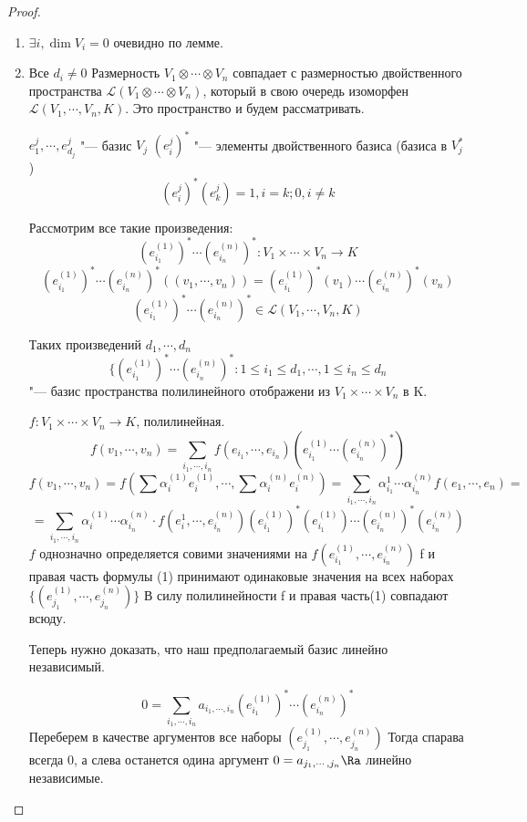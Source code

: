 \begin{proof}
    \begin{enumerate}
    \item $\exists i, \dim V_i = 0$ очевидно по лемме.
    \item Все $d_i \ne 0$
    Размерность $V_1 \otimes \cdots \otimes V_n$ совпадает
    с размерностью двойственного пространства $\mathcal{L}(V_1 \otimes \cdots \otimes V_n)$, который
    в свою очередь изоморфен $\mathcal{L}(V_1, \cdots, V_n, K)$. Это пространство и будем рассматривать.
  
    $e_1^{j}, \cdots, e_{d_j}^j$  "--- базис $V_j$
    $(e_i^j)^*$ "--- элементы двойственного базиса (базиса в $V_j^*$)
    $$(e_i^j)^*(e_{k}^j) =  1, i = k; 0, i \ne k$$
   
    Рассмотрим все такие произведения:
    $$(e^{(1)}_{i_1})^* \cdots (e_{i_n}^{(n)})^* \colon V_1 \times \cdots \times V_n \to K$$
    $$(e_{i_1}^{(1)})^* \cdots (e^{(n)}_{i_n})^*((v_1, \cdots, v_n)) = (e_{i_1}^{(1)})^*(v_1) \cdots (e_{i_n}^{(n)})^*(v_n)$$
    $$(e_{i_1}^{(1)})^* \cdots (e_{i_n}^{(n)})^* \in \mathcal{L}(V_1, \cdots, V_n, K)$$

    Таких произведений $d_1, \cdots, d_n$ 
    $$\{ (e_{i_1}^{(1)})^* \cdots (e_{i_n}^{(n)})^* \colon 1 \le i_1 \le d_1, \cdots, 1 \le i_n \le d_n$$ "--- базис
    пространства полилинейного отображени из $V_1 \times \cdots \times V_n$ в K.

    $f \colon V_1 \times \cdots \times V_n \to K$, полилинейная. 
    $$f(v_1, \cdots, v_n) = \sum_{i_1, \cdots, i_n}f(e_{i_1}, \cdots, e_{i_n})(e_{i_1}^{(1)} \cdots (e_{i_n}^{(n)})^{*})$$
    $$f(v_1, \cdots, v_n) = f(\sum \alpha_i^{(1)}e_i^{(1)}, \cdots, \sum\alpha_i^{(n)}e_i^{(n)}) = \sum_{i_1, \cdots, i_n}\alpha_{i_1}^{1} \cdots \alpha_{i_n}^{(n)}f(e_1, \cdots, e_n) = $$
    $$= \sum_{i_1, \cdots, i_n} \alpha_i^{(1)} \cdots \alpha_{i_n}^{(n)} \cdot f(e_{i}^{1}, \cdots, e_{i_n}^{(n)})(e_{i_1}^{(1)})^*(e_{i_1}^{(1)}) \cdots (e_{i_n}^{(n)})^*(e_{i_n}^{(n)})$$
    $f$ однозначно определяется совими значениями на $f(e_{i_1}^{(1)}, \cdots, e_{i_n}^{(n)})$
    f и правая часть формулы (1) принимают одинаковые значения на всех наборах $\{(e_{j_1}^{(1)}, \cdots, e_{j_n}^{(n)})\}$
    В силу полилинейности f и правая часть(1) совпадают всюду.
   
    Теперь нужно доказать, что наш предполагаемый базис линейно независимый. 

    $$0 = \sum_{i_1, \cdots, i_n}a_{i_1, \cdots, i_n}(e_{i_1}^{(1)})^* \cdots (e_{i_n}^{(n)})^*$$
    Переберем в качестве аргументов все наборы $(e_{j_1}^{(1)}, \cdots, e_{j_n}^{(n)})$
    Тогда спарава всегда 0, а слева останется одина аргумент
    $0 = a_{j_1, \cdots, j_n} \Ra$  линейно независимые. 


\end{enumerate}
\end{proof}
